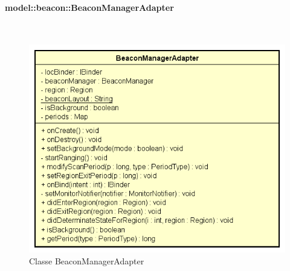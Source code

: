 \documentclass[../DefinizioneDiProdotto.tex]{subfiles}
\begin{document}
\paragraph{model::beacon::BeaconManagerAdapter}
\
\begin{figure}[H]
	\centering
	\includegraphics[width=\maxwidth]{img/BeaconManagerAdapter.png}
	\caption{Classe BeaconManagerAdapter}\label{fig:model::beacon::BeaconManagerAdapter} 
\end{figure}
\end{document}
